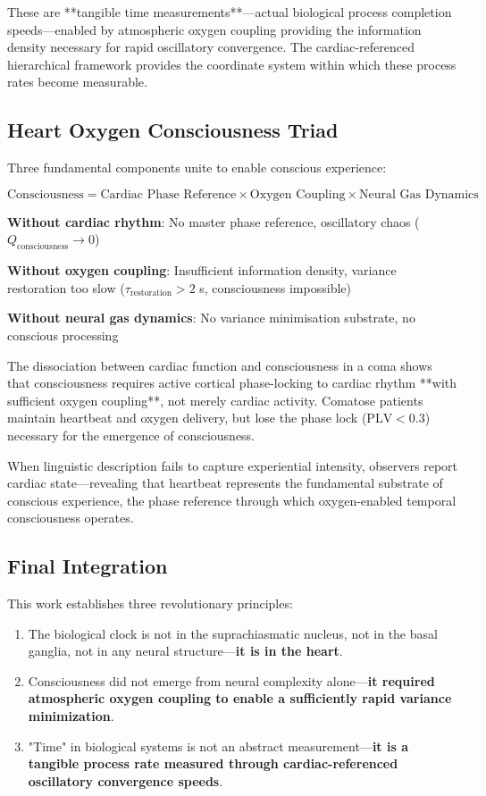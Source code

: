 \documentclass[12pt]{article}
\theoremstyle{remark}
\begin{document}
These are **tangible time measurements**—actual biological process completion speeds—enabled by atmospheric oxygen coupling providing the information density necessary for rapid oscillatory convergence. The cardiac-referenced hierarchical framework provides the coordinate system within which these process rates become measurable.

\subsection{Heart Oxygen Consciousness Triad}

Three fundamental components unite to enable conscious experience:

\begin{equation}
\text{Consciousness} = \text{Cardiac Phase Reference} \times \text{Oxygen Coupling} \times \text{Neural Gas Dynamics}
\end{equation}

\textbf{Without cardiac rhythm}: No master phase reference, oscillatory chaos ($Q_{\text{consciousness}} \to 0$)

\textbf{Without oxygen coupling}: Insufficient information density, variance restoration too slow ($\tau_{\text{restoration}} > 2$ s, consciousness impossible)

\textbf{Without neural gas dynamics}: No variance minimisation substrate, no conscious processing

The dissociation between cardiac function and consciousness in a coma shows that consciousness requires active cortical phase-locking to cardiac rhythm **with sufficient oxygen coupling**, not merely cardiac activity. Comatose patients maintain heartbeat and oxygen delivery, but lose the phase lock ($\text{PLV} < 0.3$) necessary for the emergence of consciousness.

When linguistic description fails to capture experiential intensity, observers report cardiac state—revealing that heartbeat represents the fundamental substrate of conscious experience, the phase reference through which oxygen-enabled temporal consciousness operates.

\subsection{Final Integration}

This work establishes three revolutionary principles:

\begin{enumerate}
\item The biological clock is not in the suprachiasmatic nucleus, not in the basal ganglia, not in any neural structure—\textbf{it is in the heart}.

\item Consciousness did not emerge from neural complexity alone—\textbf{it required atmospheric oxygen coupling to enable a sufficiently rapid variance minimization}.

\item "Time" in biological systems is not an abstract measurement—\textbf{it is a tangible process rate measured through cardiac-referenced oscillatory convergence speeds}.
\end{enumerate}
\end{document}
